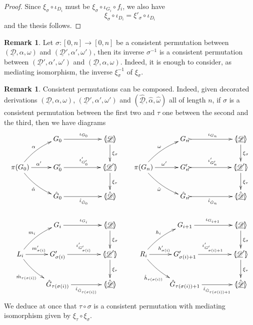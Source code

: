 \documentclass[a4paper]{article}
\newcommand{\dder}[1]{\mathscr{#1}}
\newcommand{\der}[1]{\underline{\dder{#1}}}
\newcommand{\lpro}{\langle \hspace{-1.85pt}[}
\newcommand{\rpro}{]\hspace{-1.85pt}\rangle}
\newcommand{\tpro}[1]{\lpro \der{#1}\rpro}
\theoremstyle{definition}
\newtheorem{remark}[theorem]{Remark}
\begin{document}
\begin{proof}
	Since $\xi_\sigma \circ \iota_{D_i}$ must be $\xi_\sigma \circ \iota_{G_i}\circ f_i$, we also have
	\[\xi_\sigma \circ \iota_{D_i}=\xi'_\sigma \circ \iota_{D_i}\] 
and the thesis follows.
\end{proof}


\begin{remark}\label{rem:inversa}
Let $\sigma\colon [0,n]\to [0,n]$ be a consistent permutation between $(\der{D},\alpha, \omega)$ and $(\der{D}', \alpha', \omega')$, then its inverse $\sigma^{-1}$ is a consistent permutation between $(\der{D}', \alpha', \omega')$ and $(\der{D},\alpha, \omega)$. Indeed, it is enough to consider, as mediating isomorphism, the inverse $\xi^{-1}_\sigma$ of $\xi_\sigma$.
\end{remark}

\begin{remark}\label{rem:comp} Consistent permutations can be composed. Indeed, given decorated derivations $(\der{D}, \alpha, \omega)$, $(\der{D}', \alpha', \omega')$ and $(\der{\hat{D}}, \hat{\alpha}, \hat{\omega})$ all of length $n$, if $\sigma$ is a consistent permutation between the first two and $\tau$ one between the second and the third, then  we have diagrams
	\[\xymatrix@C=18pt{ & G_0 \ar[rr]^{\iota_{G_0}} &&\tpro{D} \ar[d]^{\xi_\sigma}&  &  G_{n} \ar@{>->}[rr]^{\iota_{ G_{n}}} &&\tpro{D} \ar[d]^{\xi_\sigma} \\ \pi(G_0) \ar@/_.2cm/[dr]_{\hat{\alpha}}\ar@/^.2cm/[ur]^{\alpha} \ar[r]^{\alpha'} &G'_0 \ar[rr]^{\iota'_{G'_0}}  &&\lpro \der{D}'  \rpro \ar[d]^{\xi_{\tau}}&\pi({ G_{n}})\ar@/_.2cm/[dr]_{\hat{\omega}}\ar@/^.2cm/[ur]^{\omega} \ar[r]^{\omega'} & { G'_{n}} \ar@{>->}[rr]^{\iota'_{{ G'_{n}}}} && \lpro \der{D}' \rpro \ar[d]^{\xi_{\tau}}\\ &\hat{G}_0  \ar[rr]_{\hat{\iota}_{\hat{G}_0}}&& \lpro \hat{\der{D}}\rpro  && \hat{G}_n \ar@{>->}[rr]_{\hat{\iota}_{\hat{G}_n}}&& \lpro \hat{\der{D}} \rpro \\& G_i \ar[rr]^{\iota_{G_i}} &&\tpro{D} \ar[d]^{\xi_\sigma}&  &  G_{i+1} \ar[rr]^{\iota_{G_{i+1}}} &&\tpro{D} \ar[d]^{\xi_\sigma} \\ L_i \ar@/_.2cm/[dr]_{\hat{m}_{\tau(\sigma(i))}}\ar@/^.2cm/[ur]^{m_i} \ar[r]^{m'_{\sigma(i)}} &G'_{\sigma(i)} \ar[rr]^{\iota'_{G'_{\sigma(i)}}}  &&\lpro \der{D}'  \rpro \ar[d]^{\xi_{\tau}}&R_i \ar@/_.2cm/[dr]_{\hat{h}_{\tau(\sigma(i))}}\ar@/^.2cm/[ur]^{h_i} \ar[r]^{h'_{\sigma(i)}} & G'_{\sigma(i)+1} \ar[rr]^{\iota'_{G'_{\sigma(i)+1}}} && \lpro \der{D}' \rpro \ar[d]^{\xi_{\tau}}\\ &\hat{G}_{\tau(\sigma(i))}  \ar[rr]_-{\hat{\iota}_{\hat{G}_{\tau(\sigma(i))}}}&& \lpro \hat{\der{D}}\rpro  && \hat{G}_{\tau(\sigma(i))+1} \ar[rr]_-{\hat{\iota}_{\hat{G}_{\tau(\sigma(i))+1}}}&& \lpro \hat{\der{D}} \rpro	}\]
	We deduce at once that $\tau\circ \sigma$ is a consistent permutation with mediating isomorphism given by $\xi_{\tau} \circ \xi_\sigma$.
\end{remark}
\end{document}
